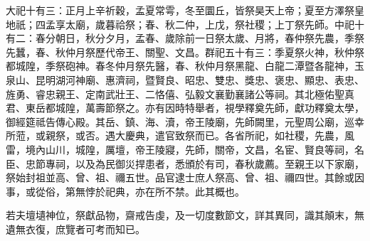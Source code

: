 \begin{pinyinscope}
大祀十有三：正月上辛祈穀，孟夏常雩，冬至圜丘，皆祭昊天上帝；夏至方澤祭皇地祇；四孟享太廟，歲暮祫祭；春、秋二仲，上戊，祭社稷；上丁祭先師。中祀十有二：春分朝日，秋分夕月，孟春、歲除前一日祭太歲、月將，春仲祭先農，季祭先蠶，春、秋仲月祭歷代帝王、關聖、文昌。群祀五十有三：季夏祭火神，秋仲祭都城隍，季祭砲神。春冬仲月祭先醫，春、秋仲月祭黑龍、白龍二潭暨各龍神，玉泉山、昆明湖河神廟、惠濟祠，暨賢良、昭忠、雙忠、獎忠、褒忠、顯忠、表忠、旌勇、睿忠親王、定南武壯王、二恪僖、弘毅文襄勤襄諸公等祠。其北極佑聖真君、東岳都城隍，萬壽節祭之。亦有因時特舉者，視學釋奠先師，獻功釋奠太學，御經筵祗告傳心殿。其岳、鎮、海、瀆，帝王陵廟，先師闕里，元聖周公廟，巡幸所蒞，或親祭，或否。遇大慶典，遣官致祭而已。各省所祀，如社稷，先農，風雷，境內山川，城隍，厲壇，帝王陵寢，先師，關帝，文昌，名宦、賢良等祠，名臣、忠節專祠，以及為民御災捍患者，悉頒於有司，春秋歲薦。至親王以下家廟，祭始封祖並高、曾、祖、禰五世。品官逮士庶人祭高、曾、祖、禰四世。其餘或因事，或從俗，第無悖於祀典，亦在所不禁。此其概也。

若夫壇壝神位，祭獻品物，齋戒告虔，及一切度數節文，詳其異同，識其顛末，無遺無衣復，庶覽者可考而知已。


\end{pinyinscope}
